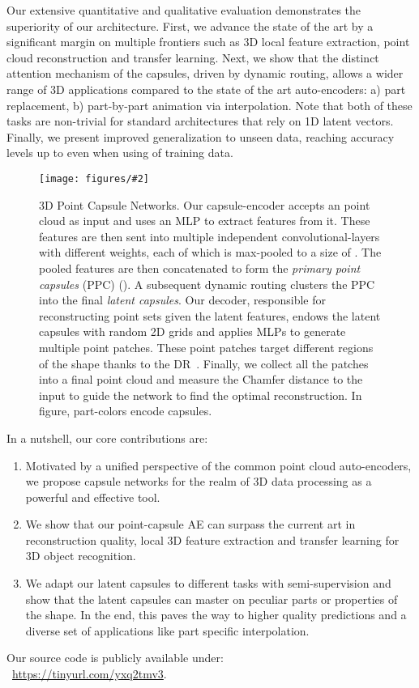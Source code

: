 \documentclass[10pt,twocolumn,letterpaper]{article}
\theoremstyle{break}
\newcommand{\insertimageStar}[5]{ \begin{figure*}[#5]
\centering
\texttt{[image: figures/\#2]}
\caption{#3}
\label{#4}
\end{figure*}
}
\begin{document}
Our extensive quantitative and qualitative evaluation demonstrates the superiority of our architecture. First, we advance the state of the art by a significant margin on multiple frontiers such as 3D local feature extraction, point cloud reconstruction and transfer learning. Next, we show that the distinct attention mechanism of the capsules, driven by dynamic routing, allows a wider range of 3D applications compared to the state of the art auto-encoders: a) part replacement, b) part-by-part animation via interpolation. Note that both of these tasks are non-trivial for standard architectures that rely on 1D latent vectors. Finally, we present improved generalization to unseen data, reaching accuracy levels up to  even when using  of training data. 
\insertimageStar{0.9725}{pipeline_final_cropped.pdf}{3D Point Capsule Networks. Our capsule-encoder accepts an  point cloud as input and uses an MLP to extract  features from it. These features are then sent into multiple independent convolutional-layers with different weights, each of which is max-pooled to a size of . The pooled features are then concatenated to form the \textit{primary point capsules} (PPC) (). A subsequent dynamic routing clusters the PPC into the final \textit{latent capsules}. Our decoder, responsible for reconstructing point sets given the latent features, endows the latent capsules with random 2D grids and applies MLPs  to generate multiple point patches. These point patches target different regions of the shape thanks to the DR~\cite{sabour2017dynamic}. Finally, we collect all the patches into a final point cloud and measure the Chamfer distance to the input to guide the network to find the optimal reconstruction. In figure, part-colors encode capsules.\vspace{-3.5mm}}{fig:3dpointcapsnet}{t!}
In a nutshell, our core contributions are: 
\begin{enumerate}[itemsep=0ex]
\item Motivated by a unified perspective of the common point cloud auto-encoders, we propose capsule networks for the realm of 3D data processing as a powerful and effective tool. \item We show that our point-capsule AE can surpass the current art in reconstruction quality, local 3D feature extraction and transfer learning for 3D object recognition.
\item We adapt our latent capsules to different tasks with semi-supervision and show that the latent capsules can master on peculiar parts or properties of the shape. In the end, this paves the way to higher quality predictions and a diverse set of applications like part specific interpolation.
\end{enumerate}\vspace{0.3pt}
Our source code is publicly available under:\\~{\small{\url{https://tinyurl.com/yxq2tmv3}}}\normalfont.
\end{document}
